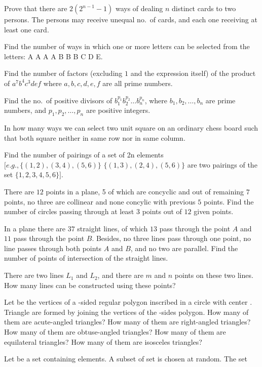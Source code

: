 \item Prove that there are $2(2^{n - 1} - 1)$ ways of dealing $n$ distinct cards to two persons. The persons
  may receive unequal no.\ of cards, and each one receiving at least one card.
\item Find the number of ways in which one or more letters can be selected from the letters: A A A A B B B C
  D E.
\item Find the number of factors (excluding $1$ and the expression itself) of the product of $a^7b^4c^3def$
  where $a, b, c, d, e, f$ are all prime numbers.
\item Find the no.\ of positive divisors of $b_1^{p_1}b_2^{p_2}\ldots b_n^{p_n}$, where $b_1, b_2, \ldots,
  b_n$ are prime numbers, and $p_1, p_2, \ldots, p_n$ are positive integers.
\item In how many ways we can select two unit square on an ordinary chess board such that both square
  neither in same row nor in same column.
\item Find the number of pairings of a set of 2n elements $[e.g., \{(1, 2), (3, 4), (5, 6)\}$ $\{(1, 3), (2,
  4), (5, 6)\}$ are two pairings of the set $\{1, 2, 3, 4, 5, 6\}]$.
\item There are $12$ points in a plane, 5 of which are concyclic and out of remaining $7$ points, no three
  are collinear and none concylic with previous $5$ points. Find the number of circles passing through at
  least $3$ points out of $12$ given points.
\item In a plane there are $37$ straight lines, of which $13$ pass through the point $A$ and $11$ pass
  through the point $B$. Besides, no three lines pass through one point, no line passes through both points
  $A$ and $B$, and no two are parallel. Find the number of points of intersection of the straight lines.
\item There are two lines $L_1$ and $L_2$, and there are $m$ and $n$ points on these two lines. How many
  lines can be constructed using these points?
\item Let  be the vertices of a -sided regular polygon inscribed in a
  circle with center . Triangle are formed by joining the vertices of the -sides polygon. How
  many of them are acute-angled triangles? How many of them are right-angled triangles? How many of them are
  obtuse-angled triangles? How many of them are equilateral triangles? How many of them are isosceles
  triangles?
\item Let  be a set containing  elements. A subset  of set  is chosen at random. The set
